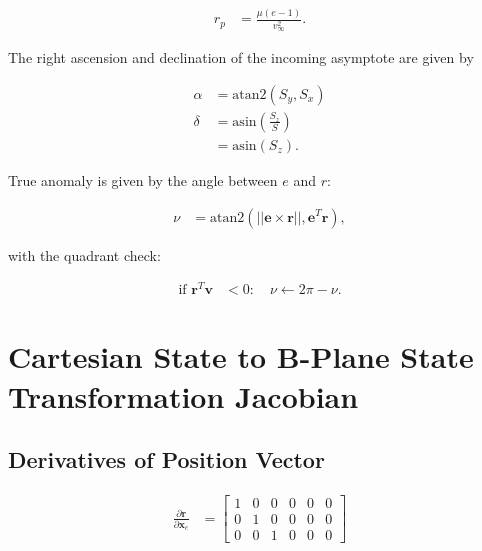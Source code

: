 \documentclass[]{article}
\newcommand{\vb}[1]{\bm{#1}} %
\newcommand{\pd}[2]{\frac{\partial #1}{\partial #2}} %
\newcommand{\xc}[0]{\vb{x}_c}
\begin{document}
\begin{align}
	r_p &= \frac{\mu \left( e - 1 \right)}{v_{\infty}^2}.
\end{align}


\noindent The right ascension and declination of the incoming asymptote are given by

\begin{align}
	\alpha &= \mathrm{atan2} \left( S_y, S_x \right) \\
	\delta &= \mathrm{asin} \left( \frac{S_z}{S} \right) \\
	&= \mathrm{asin} \left( S_z \right).
\end{align}


\noindent True anomaly is given by the angle between $e$ and $r$:

\begin{align}
\label{eq:TA_from_xc}
	\nu &= \mathrm{atan2} \left( || \vb{e} \times \vb{r} ||, \vb{e}^T \vb{r} \right),
\end{align}

\noindent with the quadrant check:

\begin{align}
	\text{if } \vb{r}^T \vb{v} &< 0: \quad \nu \leftarrow 2 \pi - \nu.
\end{align}

\section{Cartesian State to B-Plane State Transformation Jacobian}
\label{sec:cartesian2bplanejac}

\subsection{Derivatives of Position Vector}

\begin{align}
\pd{\vb{r}}{\xc} &= \left[ \begin{array}{cccccc}
1 & 0 & 0 & 0 & 0 & 0 \\
0 & 1 & 0 & 0 & 0 & 0 \\
0 & 0 & 1 & 0 & 0 & 0
\end{array} \right]
\end{align}
\end{document}
